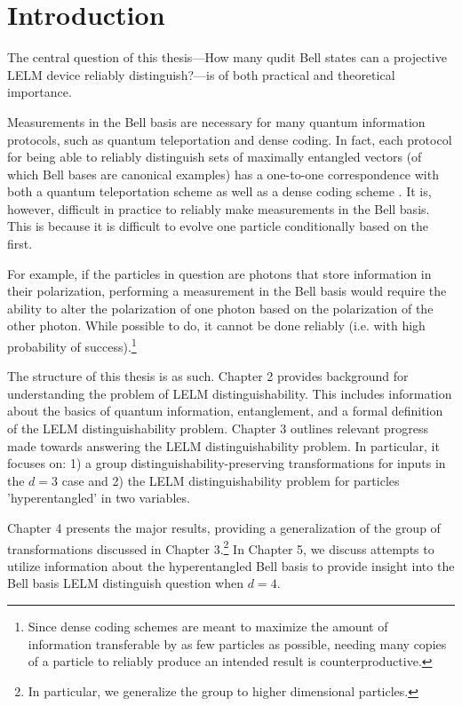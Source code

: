 \chapter{Introduction}

The central question of this thesis---How many qudit Bell states can a projective LELM device reliably distinguish?---is of both practical and theoretical importance. 

Measurements in the Bell basis are necessary for many quantum information protocols, such as quantum teleportation and dense coding. In fact, each protocol for being able to reliably distinguish sets of maximally entangled vectors (of which Bell bases are canonical examples) has a one-to-one correspondence with both a quantum teleportation scheme as well as a dense coding scheme \cite{coding}. It is, however, difficult in practice to reliably make measurements in the Bell basis. This is because it is difficult to evolve one particle conditionally based on the first. 

For example, if the particles in question are photons that store information in their polarization, performing a measurement in the Bell basis would require the ability to alter the polarization of one photon based on the polarization of the other photon. While possible to do, it cannot be done reliably (i.e. with high probability of success).\footnote{Since dense coding schemes are meant to maximize the amount of information transferable by as few particles as possible, needing many copies of a particle to reliably produce an intended result is counterproductive.}


The structure of this thesis is as such. Chapter 2 provides background for understanding the problem of LELM distinguishability. This includes information about the basics of quantum information, entanglement, and a formal definition of the LELM distinguishability problem. Chapter 3 outlines relevant progress made towards answering the LELM distinguishability problem. In particular, it focuses on: 1) a group distinguishability-preserving transformations for inputs in the $d=3$ case and 2) the LELM distinguishability problem for particles 'hyperentangled' in two variables.

Chapter 4 presents the major results, providing a generalization of the group of transformations discussed in Chapter 3.\footnote{In particular, we generalize the group to higher dimensional particles.} In Chapter 5, we discuss attempts to utilize information about the hyperentangled Bell basis to provide insight into the Bell basis LELM distinguish question when $d=4$.


